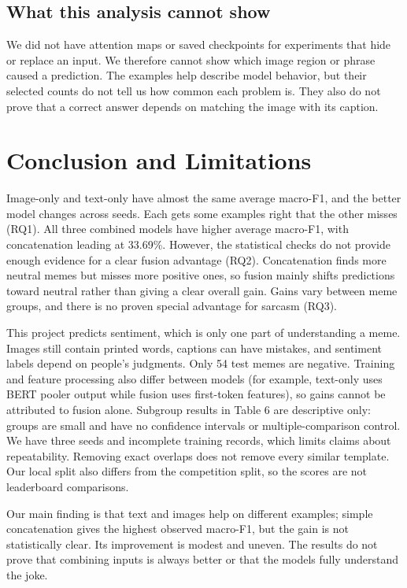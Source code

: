 \documentclass[11pt,a4paper]{article}
\begin{document}
\subsection{What this analysis cannot show}
We did not have attention maps or saved checkpoints for experiments that hide or replace an input. We therefore cannot show which image region or phrase caused a prediction. The examples help describe model behavior, but their selected counts do not tell us how common each problem is. They also do not prove that a correct answer depends on matching the image with its caption.

\clearpage
\section{Conclusion and Limitations}
\label{sec:conclusion}

Image-only and text-only have almost the same average macro-F1, and the better model changes across seeds. Each gets some examples right that the other misses (RQ1). All three combined models have higher average macro-F1, with concatenation leading at 33.69\%. However, the statistical checks do not provide enough evidence for a clear fusion advantage (RQ2). Concatenation finds more neutral memes but misses more positive ones, so fusion mainly shifts predictions toward neutral rather than giving a clear overall gain. Gains vary between meme groups, and there is no proven special advantage for sarcasm (RQ3).

This project predicts sentiment, which is only one part of understanding a meme. Images still contain printed words, captions can have mistakes, and sentiment labels depend on people's judgments. Only 54 test memes are negative. Training and feature processing also differ between models (for example, text-only uses BERT pooler output while fusion uses first-token features), so gains cannot be attributed to fusion alone. Subgroup results in Table 6 are descriptive only: groups are small and have no confidence intervals or multiple-comparison control. We have three seeds and incomplete training records, which limits claims about repeatability. Removing exact overlaps does not remove every similar template. Our local split also differs from the competition split, so the scores are not leaderboard comparisons.

Our main finding is that text and images help on different examples; simple concatenation gives the highest observed macro-F1, but the gain is not statistically clear. Its improvement is modest and uneven. The results do not prove that combining inputs is always better or that the models fully understand the joke.
\end{document}
